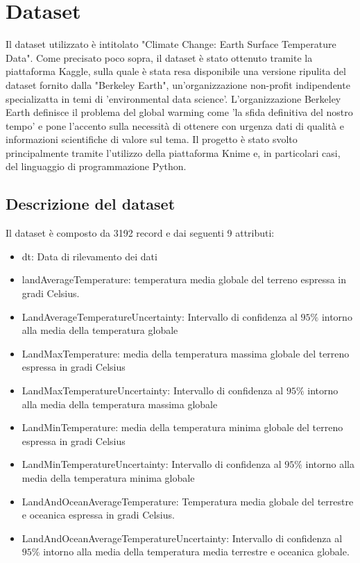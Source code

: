 \documentclass[12pt, a4paper, twocolumn]{article} %
\begin{document}

\section{Dataset}

Il dataset utilizzato è intitolato "Climate Change: Earth Surface Temperature Data".%
Come precisato poco sopra, il dataset è stato ottenuto tramite la piattaforma Kaggle, sulla quale è stata resa disponibile una versione ripulita del dataset fornito dalla "Berkeley Earth", un'organizzazione non-profit indipendente specializatta in temi di 'environmental data science'.
L'organizzazione Berkeley Earth definisce il problema del global warming come 'la sfida definitiva del nostro tempo' e pone l'accento sulla necessità di ottenere con urgenza dati di qualità e informazioni scientifiche di valore sul tema.
Il progetto è stato svolto principalmente tramite l'utilizzo della piattaforma Knime e, in particolari casi, del linguaggio di programmazione Python.

\subsection{Descrizione del dataset}
Il dataset è composto da 3192 record e dai seguenti 9 attributi:
\begin{itemize}
	\item dt: Data di rilevamento dei dati
	\item landAverageTemperature: temperatura media globale del terreno espressa in gradi Celsius.
	\item LandAverageTemperatureUncertainty: Intervallo di confidenza al $95 \%$ intorno alla media della temperatura globale
	\item LandMaxTemperature: media della temperatura massima globale del terreno espressa in gradi Celsius
	\item LandMaxTemperatureUncertainty:  Intervallo di confidenza al $95 \%$ intorno alla media della temperatura massima globale
	\item LandMinTemperature: media della temperatura minima globale del terreno espressa in gradi Celsius
	\item LandMinTemperatureUncertainty: Intervallo di confidenza al $95 \%$ intorno alla media della temperatura minima globale
	\item LandAndOceanAverageTemperature: Temperatura media globale del terrestre e oceanica espressa in gradi Celsius.
	\item LandAndOceanAverageTemperatureUncertainty: Intervallo di confidenza al $95 \%$ intorno alla media della temperatura media terrestre e oceanica globale.
\end{itemize}
\end{document}
